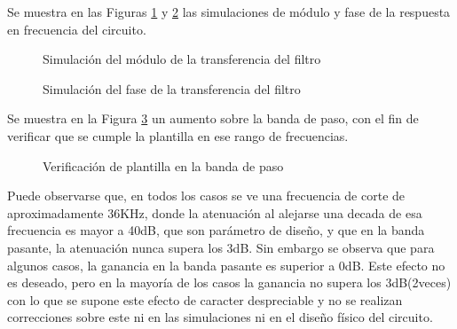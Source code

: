 Se muestra en las Figuras \ref{fig:MC_MOD} y \ref{fig:MC_PHASE} las simulaciones de m\'odulo y fase de la respuesta en frecuencia del circuito.
\begin{figure}[H]
    \centering
    \caption{Simulaci\'on del m\'odulo de la transferencia del filtro}
    \label{fig:MC_MOD}
\end{figure}
\begin{figure}[H]
    \centering
    \caption{Simulaci\'on del fase de la transferencia del filtro}
    \label{fig:MC_PHASE}
\end{figure}
Se muestra en la Figura \ref{fig:VERIFY} un aumento sobre la banda de paso, con el fin de verificar que se cumple la plantilla en ese rango de frecuencias.
\begin{figure}[H]
    \centering
    \caption{Verificaci\'on de plantilla en la banda de paso}
    \label{fig:VERIFY}
\end{figure}
Puede observarse que, en todos los casos se ve una frecuencia de corte de aproximadamente 36KHz, donde la atenuaci\'on al alejarse una decada de esa frecuencia es mayor a 40dB, que son par\'ametro de dise\~no, y que en la banda pasante, la atenuaci\'on nunca supera los 3dB. Sin embargo se observa que para algunos casos, la ganancia en la banda pasante es superior a 0dB. Este efecto no es deseado, pero en la mayor\'ia de los casos la ganancia no supera los 3dB(2veces) con lo que se supone este efecto de caracter despreciable y no se realizan correcciones sobre este ni en las simulaciones ni en el dise\~no f\'isico del circuito.


